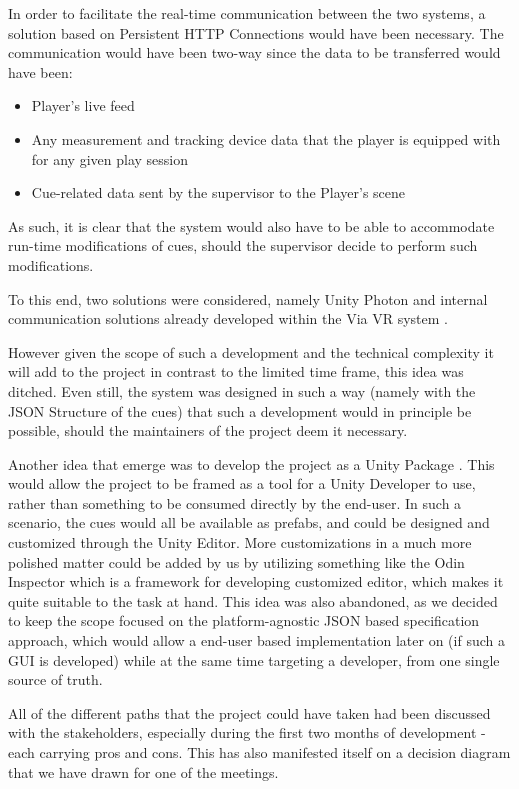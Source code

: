 \documentclass[conference]{IEEEtran}
\begin{document}
In order to facilitate the real-time communication between the two systems, a solution based on Persistent HTTP Connections would have been necessary. The communication would have been two-way since the data to be transferred would have been:
\begin{itemize}
    \item Player's live feed 
    \item Any measurement and tracking device data that the player is equipped with for any given play session
    \item Cue-related data sent by the supervisor to the Player's scene
\end{itemize}
As such, it is clear that the system would also have to be able to accommodate run-time modifications of cues, should the supervisor decide to perform such modifications.

To this end, two solutions were considered, namely Unity Photon \cite{unity_photon} and internal communication solutions already developed within the Via VR system \cite{via_vr}. 

However given the scope of such a development and the technical complexity it will add to the project in contrast to the limited time frame, this idea was ditched. Even still, the system was designed in such a way (namely with the JSON Structure of the cues) that such a development would in principle be possible, should the maintainers of the project deem it necessary.

Another idea that emerge was to develop the project as a Unity Package \cite{unity_package_manager}. This would allow the project to be framed as a tool for a Unity Developer to use, rather than something to be consumed directly by the end-user. In such a scenario, the cues would all be available as prefabs, and could be designed and customized through the Unity Editor. More customizations in a much more polished matter could be added by us by utilizing something like the Odin Inspector \cite{odin_inspector}
which is a framework for developing customized editor, which makes it quite suitable to the task at hand. This idea was also abandoned, as we decided to keep the scope focused on the platform-agnostic JSON based specification approach, which would allow a end-user based implementation later on (if such a GUI is developed) while at the same time targeting a developer, from one single source of truth.  

All of the different paths that the project could have taken had been discussed with the stakeholders, especially during the first two months of development - each carrying pros and cons. This has also manifested itself on a decision diagram that we have drawn for one of the meetings.
\end{document}

